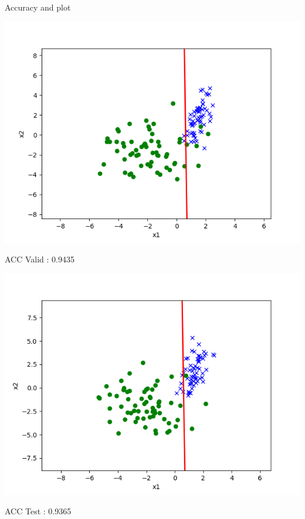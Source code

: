 \begin{answer}
Accuracy and plot

\includegraphics[width=1\textwidth]{posonly/posonly_adjusted_plot_valid.png}

ACC Valid : 0.9435

\includegraphics[width=1\textwidth]{posonly/posonly_adjusted_plot_test.png}

ACC Test  : 0.9365

\end{answer}
